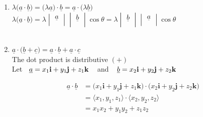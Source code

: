 \documentclass[11pt,a4paper]{article}
\begin{document}
\begin{enumerate}
$\underline{b}\cdot \underline{a} = \begin{vmatrix}
\underline{b}\\
\end{vmatrix} \begin{vmatrix}
\underline{a}\\
\end{vmatrix}\cos \theta$\\

$ \implies\hspace{0.3cm} \underline{b}\cdot\underline{a} = \underline{a}\cdot \underline{b}$\\\\ 



\item $\lambda \big(\underline{a}\cdot\underline{b}\big) = \big(\lambda \underline{a}\big)\cdot \underline{b} = \underline{a}\cdot\big(\lambda \underline{b}\big)$\\
 
$\lambda \big( \underline{a}\cdot \underline{b}\big) = \lambda \begin{vmatrix}
\underline{a}\\
\end{vmatrix} \begin{vmatrix}
\underline{b}\\
\end{vmatrix}\cos \theta = \lambda\begin{vmatrix}
\underline{b}\\
\end{vmatrix} \begin{vmatrix}
\underline{a}\\
\end{vmatrix}\cos \theta$\\\\



\item $\underline{a}\cdot \big(\underline{b} + \underline{c}\big) = \underline{a}\cdot \underline{b} + \underline{a}\cdot \underline{c}$\\

The dot product is distributive $(+)$\\

Let $\hspace{0.2cm} \underline{a} = x_1\textbf{i} + y_1\textbf{j} + z_1\textbf{k}\hspace{0.3cm}$ and $\hspace{0.3cm} \underline{b} = x_2\textbf{i} + y_2\textbf{j} + z_2\textbf{k}$


\begin{align*}
\underline{a}\cdot \underline{b} & = \big( x_1\textbf{i} + y_1\textbf{j} + z_1\textbf{k}\big)\cdot \big(x_2\textbf{i} + y_2\textbf{j} + z_2\textbf{k}\big)\\
& = \big\langle x_1, y_1, z_1\big\rangle \cdot \big\langle x_2, y_2, z_2\big\rangle\\
& = x_1x_2 + y_1y_2 + z_1z_2\\\\ 
\end{align*}
\end{enumerate}
\end{document}
